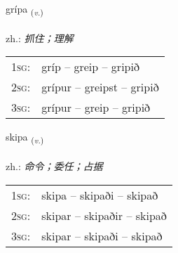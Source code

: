 \documentclass[frontgrid, backgrid]{flacards}\usepackage[]{graphicx}\usepackage[]{xcolor}
\begin{document}
\renewcommand{\flhead}{\vskip5pt \fboxsep=0pt {\small\bfseries\footnotesize Sagnorð | 动词}}
\renewcommand{\fcfoot}{\vskip5pt \fboxsep=0pt \hspace{2pt}{\small\bfseries\footnotesize 1K}}

\renewcommand{\blhead}{\vskip5pt {\small\bfseries\footnotesize Sagnorð | 动词 }}
\renewcommand{\bcfoot}{\vskip5pt \hspace{2pt}{\small\bfseries\footnotesize 1K}}


{grípa \small{\textsubscript{(\textit{v.})}} \\[1ex] %
\textphonetic{[kriːpa]} \\
zh.: \emph{抓住；理解} \\  [2ex]
\renewcommand*{\arraystretch}{0.8}
\begin{tabular}{p{1cm}l}
\textsc{1sg}: & gríp -- greip -- gripið \\ 
\textsc{2sg}: & grípur -- greipst -- gripið \\ 
\textsc{3sg}: & grípur -- greip -- gripið \\ 
\end{tabular}
}

\renewcommand{\flhead}{\vskip5pt \fboxsep=0pt {\small\bfseries\footnotesize Sagnorð | 动词}}
\renewcommand{\fcfoot}{\vskip5pt \fboxsep=0pt \hspace{2pt}{\small\bfseries\footnotesize 1K}}

\renewcommand{\blhead}{\vskip5pt {\small\bfseries\footnotesize Sagnorð | 动词 }}
\renewcommand{\bcfoot}{\vskip5pt \hspace{2pt}{\small\bfseries\footnotesize 1K}}


{skipa \small{\textsubscript{(\textit{v.})}} \\[1ex] %
\textphonetic{[scɪːpa]} \\
zh.: \emph{命令；委任；占据} \\  [2ex]
\renewcommand*{\arraystretch}{0.8}
\begin{tabular}{p{1cm}l}
\textsc{1sg}: & skipa -- skipaði -- skipað \\ 
\textsc{2sg}: & skipar -- skipaðir -- skipað \\ 
\textsc{3sg}: & skipar -- skipaði -- skipað \\ 
\end{tabular}
}
\end{document}
